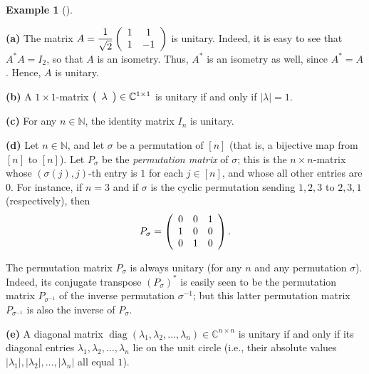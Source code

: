 \documentclass[numbers=enddot,12pt,final,onecolumn,notitlepage]{scrartcl}%
\numberwithin{exer}{subsection}
\theoremstyle{definition}
\newtheorem{exam}[theo]{Example}
\newenvironment{example}[1][]
{\begin{exam}[#1]\begin{leftbar}}
{\end{leftbar}\end{exam}}
\begin{document}
\begin{example}
\textbf{(a)} The matrix $A=\dfrac{1}{\sqrt{2}}\left(
\begin{array}
[c]{cc}%
1 & 1\\
1 & -1
\end{array}
\right)  $ is unitary. Indeed, it is easy to see that $A^{\ast}A=I_{2}$, so
that $A$ is an isometry. Thus, $A^{\ast}$ is an isometry as well, since
$A^{\ast}=A$. Hence, $A$ is unitary. \medskip

\textbf{(b)} A $1\times1$-matrix $\left(
\begin{array}
[c]{c}%
\lambda
\end{array}
\right)  \in\mathbb{C}^{1\times1}$ is unitary if and only if $\left\vert
\lambda\right\vert =1$. \medskip

\textbf{(c)} For any $n\in\mathbb{N}$, the identity matrix $I_{n}$ is unitary.
\medskip

\textbf{(d)} Let $n\in\mathbb{N}$, and let $\sigma$ be a permutation of
$\left[  n\right]  $ (that is, a bijective map from $\left[  n\right]  $ to
$\left[  n\right]  $). Let $P_{\sigma}$ be the \emph{permutation matrix} of
$\sigma$; this is the $n\times n$-matrix whose $\left(  \sigma\left(
j\right)  ,j\right)  $-th entry is $1$ for each $j\in\left[  n\right]  $, and
whose all other entries are $0$. For instance, if $n=3$ and if $\sigma$ is the
cyclic permutation sending $1,2,3$ to $2,3,1$ (respectively), then%
\[
P_{\sigma}=\left(
\begin{array}
[c]{ccc}%
0 & 0 & 1\\
1 & 0 & 0\\
0 & 1 & 0
\end{array}
\right)  .
\]


The permutation matrix $P_{\sigma}$ is always unitary (for any $n$ and any
permutation $\sigma$). Indeed, its conjugate transpose $\left(  P_{\sigma
}\right)  ^{\ast}$ is easily seen to be the permutation matrix $P_{\sigma
^{-1}}$ of the inverse permutation $\sigma^{-1}$; but this latter permutation
matrix $P_{\sigma^{-1}}$ is also the inverse of $P_{\sigma}$. \medskip

\textbf{(e)} A diagonal matrix $\operatorname*{diag}\left(  \lambda
_{1},\lambda_{2},\ldots,\lambda_{n}\right)  \in\mathbb{C}^{n\times n}$ is
unitary if and only if its diagonal entries $\lambda_{1},\lambda_{2}%
,\ldots,\lambda_{n}$ lie on the unit circle (i.e., their absolute values
$\left\vert \lambda_{1}\right\vert ,\left\vert \lambda_{2}\right\vert
,\ldots,\left\vert \lambda_{n}\right\vert $ all equal $1$).
\end{example}
\end{document}
